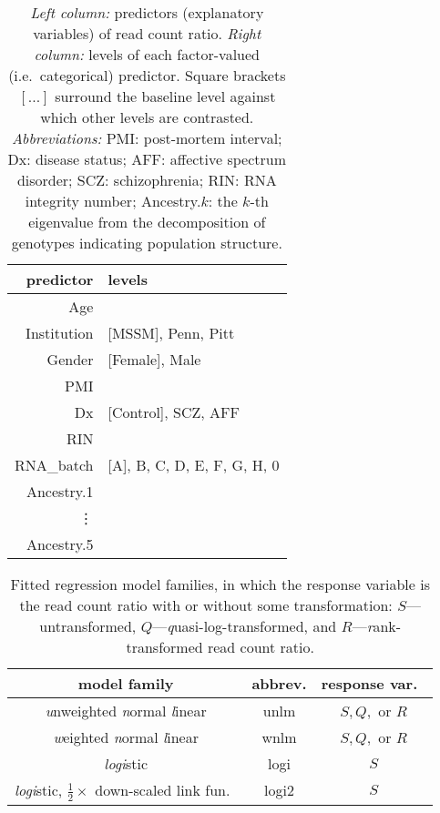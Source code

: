 \documentclass[letterpaper]{article}
\begin{document}
\begin{table}[h]
\begin{center}
\begin{tabular}{r|l}
predictor & levels\\
\hline
Age &  \\
Institution & [MSSM], Penn, Pitt\\
Gender & [Female], Male\\
PMI & \\
Dx & [Control], SCZ, AFF \\
RIN &  \\
RNA\_batch & [A], B, C, D, E, F, G, H, 0\\
Ancestry.1 & \\
\vdots & \\
Ancestry.5 &  \\
\end{tabular}
\caption{ \emph{Left column:} predictors (explanatory variables) of read count
ratio.  \emph{Right column:} levels of each factor-valued (i.e.~categorical)
predictor.  Square brackets \([...]\) surround the baseline level against
which other levels are contrasted.  \emph{Abbreviations:} PMI: post-mortem
interval; Dx: disease status; AFF: affective spectrum disorder; SCZ:
schizophrenia; RIN: RNA integrity number;
Ancestry.\(k\): the \(k\)-th eigenvalue from the decomposition of genotypes
indicating population structure.}
\label{tab:predictors}
\end{center}
\end{table}

\begin{table}
\begin{center}
\begin{tabular}{ccc}
model family & abbrev. & response var.~\\
\hline
\emph{u}nweighted \emph{n}ormal \emph{l}inear & unlm  & \(S, Q,\) or \(R\) \\
\emph{w}eighted \emph{n}ormal \emph{l}inear & wnlm  & \(S, Q,\) or \(R\) \\
\emph{logi}stic & logi & \(S\) \\
\emph{logi}stic, \(\frac{1}{2}\times\) down-scaled link fun.~& logi2 & \(S\) \\
\end{tabular}
\caption{Fitted regression model families, in which the response variable is the read count ratio with or without some transformation: 
\(S\)---untransformed, \(Q\)---\emph{q}uasi-log-transformed, and
\(R\)---\emph{r}ank-transformed read count ratio.
}
\end{center}
\label{tab:model-names}
\end{table}
\end{document}

